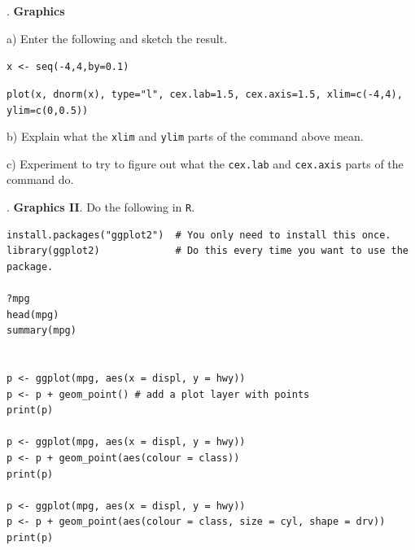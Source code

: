 \documentclass[10pt]{article}
\newcounter{EX}\setcounter{EX}{1}
\newcommand{\EXERCISE}{\arabic{EX}.\stepcounter{EX} }
\begin{document}
\EXERCISE \textbf{Graphics}

\SUBX a) Enter the following and sketch the result.

\hspace{20pt} \texttt{x <- seq(-4,4,by=0.1)}

\hspace{20pt} 
\texttt{plot(x, dnorm(x), type="l", cex.lab=1.5, cex.axis=1.5, xlim=c(-4,4), ylim=c(0,0.5))}
\vspace{0.5in}

\SUBX b) Explain what the \texttt{xlim} and \texttt{ylim} parts of the 
  command above mean.
\BSK\BSK

\SUBX c) Experiment to try to figure out what the \texttt{cex.lab}
and \texttt{cex.axis} parts of the command do.
\bigskip

\EXERCISE \textbf{Graphics II}.
Do the following in \texttt{R}.

\begin{verbatim}
install.packages("ggplot2")  # You only need to install this once.
library(ggplot2)             # Do this every time you want to use the package.

?mpg
head(mpg)
summary(mpg)


p <- ggplot(mpg, aes(x = displ, y = hwy))
p <- p + geom_point() # add a plot layer with points
print(p)

p <- ggplot(mpg, aes(x = displ, y = hwy))
p <- p + geom_point(aes(colour = class))
print(p)

p <- ggplot(mpg, aes(x = displ, y = hwy))
p <- p + geom_point(aes(colour = class, size = cyl, shape = drv))
print(p)
\end{verbatim}

\vfill
\eject
\end{document}
